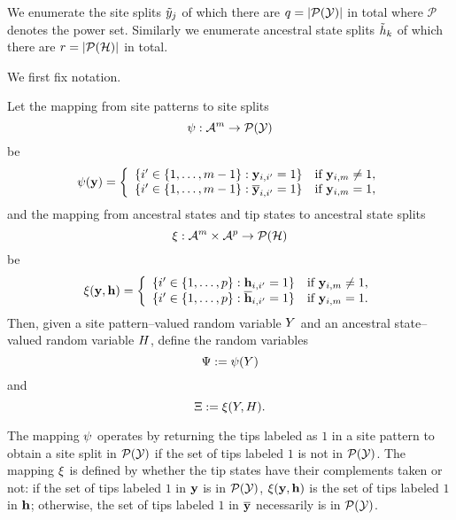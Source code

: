 We enumerate the site splits $\tilde{y}_j$ of which there are $q=|\mathcal{P}(\mathcal{Y})|$ in total where $\mathcal{P}$ denotes the power set.
Similarly we enumerate ancestral state splits $\tilde{h}_k$ of which there are $r=|\mathcal{P}(\mathcal{H})|$ in total.

We first fix notation.
\begin{definition}
Let the mapping from site patterns to site splits
\[
\psi:\mathcal{A}^m\rightarrow\mathcal{P}(\mathcal{Y})
\]
be
\[
\psi(\mathbf{y}) =
\left\{
    \begin{array}{ll}
        \{i'\in\{1,\ldots,m-1\}: \mathbf{y}_{i,i'}=1\}  & \mbox{if } \mathbf{y}_{i,m}\neq 1,\\
        \{i'\in\{1,\ldots,m-1\}: \overline{\mathbf{y}}_{i,i'}=1\}  & \mbox{if } \mathbf{y}_{i,m}=1,
    \end{array}
\right.
\]
and the mapping from ancestral states and tip states to ancestral state splits
\[
\xi:\mathcal{A}^m\times\mathcal{A}^p\rightarrow\mathcal{P}(\mathcal{H})
\]
be
\[
\xi(\mathbf{y}, \mathbf{h}) =
\left\{
    \begin{array}{ll}
        \{i'\in\{1,\ldots,p\}: \mathbf{h}_{i,i'}=1\}  & \mbox{if } \mathbf{y}_{i,m}\neq 1,\\
        \{i'\in\{1,\ldots,p\}: \overline{\mathbf{h}}_{i,i'}=1\}  & \mbox{if } \mathbf{y}_{i,m}=1.
    \end{array}
\right.
\]
Then, given a site pattern--valued random variable $Y$ and an ancestral state--valued random variable $H$, define the random variables
\[
\Psi := \psi(Y)
\]
and
\[
\Xi := \xi(Y, H).
\]
\end{definition}
The mapping $\psi$ operates by returning the tips labeled as $1$ in a site pattern to obtain a site split in $\mathcal{P}(\mathcal{Y})$ if the set of tips labeled $1$ is not in $\mathcal{P}(\mathcal{Y})$.
The mapping $\xi$ is defined by whether the tip states have their complements taken or not: if the set of tips labeled $1$ in $\mathbf{y}$ is in $\mathcal{P}(\mathcal{Y})$, $\xi(\mathbf{y}, \mathbf{h})$ is the set of tips labeled $1$ in $\mathbf{h}$; otherwise, the set of tips labeled $1$ in $\overline{\mathbf{y}}$ necessarily is in $\mathcal{P}(\mathcal{Y})$.

